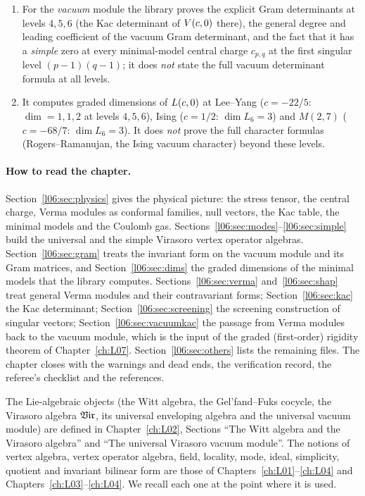 \begin{enumerate}
\item For the \emph{vacuum} module the library proves the explicit Gram determinants at levels
  $4,5,6$ (the Kac determinant of $V(c,0)$ there), the general degree and leading coefficient of the
  vacuum Gram determinant, and the fact that it has a \emph{simple} zero at every minimal-model central
  charge $c_{p,q}$ at the first singular level $(p-1)(q-1)$; it does \emph{not} state the full
  vacuum determinant formula at all levels.
\item It computes graded dimensions of $L(c,0)$ at Lee--Yang ($c = -22/5$: $\dim = 1,1,2$ at levels
  $4,5,6$), Ising ($c = 1/2$: $\dim L_6 = 3$) and $M(2,7)$ ($c = -68/7$: $\dim L_6 = 3$). It does
  \emph{not} prove the full character formulas (Rogers--Ramanujan, the Ising vacuum character) beyond
  these levels.
\end{enumerate}

\paragraph{How to read the chapter.} Section~\ref{l06:sec:physics} gives the physical picture: the
stress tensor, the central charge, Verma modules as conformal families, null vectors, the Kac table,
the minimal models and the Coulomb gas. Sections~\ref{l06:sec:modes}--\ref{l06:sec:simple} build the
universal and the simple Virasoro vertex operator algebras. Section~\ref{l06:sec:gram} treats the
invariant form on the vacuum module and its Gram matrices, and Section~\ref{l06:sec:dims} the graded
dimensions of the minimal models that the library computes. Sections~\ref{l06:sec:verma}
and~\ref{l06:sec:shap} treat general Verma modules and their contravariant forms;
Section~\ref{l06:sec:kac} the Kac determinant; Section~\ref{l06:sec:screening} the screening
construction of singular vectors; Section~\ref{l06:sec:vacuumkac} the passage from Verma modules back
to the vacuum module, which is the input of the graded (first-order) rigidity theorem of Chapter~\ref{ch:L07}.
Section~\ref{l06:sec:others} lists the remaining files. The chapter closes with the warnings and dead
ends, the verification record, the referee's checklist and the references.

The Lie-algebraic objects (the Witt algebra, the Gel'fand--Fuks cocycle, the Virasoro algebra
$\mathfrak{Vir}$, its universal enveloping algebra and the universal vacuum module) are defined in
Chapter~\ref{ch:L02}, Sections ``The Witt algebra and the Virasoro algebra'' and ``The universal
Virasoro vacuum module''. The notions of vertex algebra, vertex operator algebra, field, locality,
mode, ideal, simplicity, quotient and invariant bilinear form are those of Chapters~\ref{ch:L01}--\ref{ch:L04} and
Chapters~\ref{ch:L03}--\ref{ch:L04}. We recall each one at the point where it is used.

